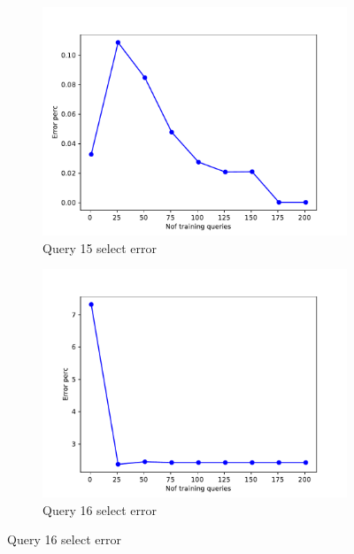 \begin{figure}[!htb]
    \begin{subfigure}[t]{0.5\textwidth}
      \includegraphics[scale=0.4]{figs/tpch10/tpch10_sel15_error.pdf}
      \caption{Query 15 select error}
      \label{fig:tpch_sel15}
    \end{subfigure}
    \begin{subfigure}[t]{0.5\textwidth}
      \includegraphics[scale=0.4]{figs/tpch10/tpch10_sel16_error.pdf}
      \caption{Query 16 select error}
      \label{fig:tpch_sel16}
     \end{subfigure}


\end{figure}
